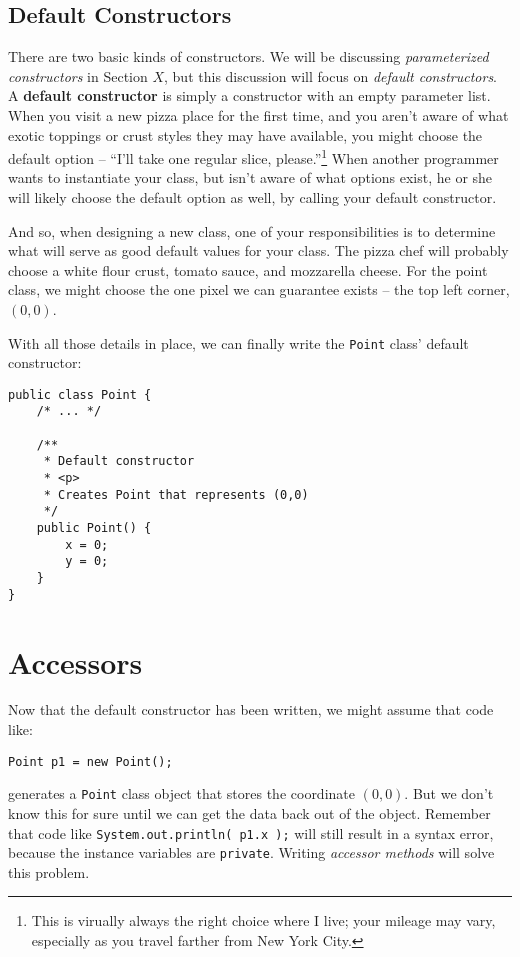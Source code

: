 \subsection{Default Constructors}

There are two basic kinds of constructors.  We will be discussing \textit{parameterized constructors} in Section $X$, but this discussion will focus on \textit{default constructors}.  A \textbf{default constructor} is simply a constructor with an empty parameter list.  When you visit a new pizza place for the first time, and you aren't aware of what exotic toppings or crust styles they may have available, you might choose the default option -- ``I'll take one regular slice, please.''\footnote{This is virually always the right choice where I live; your mileage may vary, especially as you travel farther from New York City.}  When another programmer wants to instantiate your class, but isn't aware of what options exist, he or she will likely choose the default option as well, by calling your default constructor.

And so, when designing a new class, one of your responsibilities is to determine what will serve as good default values for your class.  The pizza chef will probably choose a white flour crust, tomato sauce, and mozzarella cheese.  For the point class, we might choose the one pixel we can guarantee exists -- the top left corner, $(0,0)$.

With all those details in place, we can finally write the \texttt{Point} class' default constructor:

\begin{verbatim}
public class Point {
    /* ... */

    /**
     * Default constructor
     * <p>
     * Creates Point that represents (0,0)
     */
    public Point() {
        x = 0;
        y = 0;
    }
}
\end{verbatim}

\section{Accessors}

Now that the default constructor has been written, we might assume that code like:

\begin{verbatim}
Point p1 = new Point();
\end{verbatim}

generates a \texttt{Point} class object that stores the coordinate $(0,0)$.  But we don't know this for sure until we can get the data back out of the object.  Remember that code like \texttt{System.out.println( p1.x );} will still result in a syntax error, because the instance variables are \texttt{private}.  Writing \textit{accessor methods} will solve this problem.

